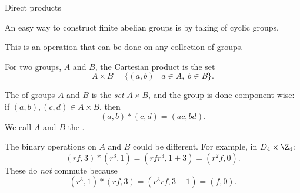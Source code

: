 \documentclass[8pt, handout]{beamer}
\newcommand{\Pause}{}
\begin{document}
\begin{frame}{Direct products}

  An easy way to construct finite abelian groups is by taking
   of cyclic groups. \medskip\Pause

  This is an operation that can be done on any collection
  of groups. \medskip\Pause
  
  For two groups, $A$ and $B$, the Cartesian product is the set
  \[
  A\times B=\big\{(a,b)\mid a\in A,\;b\in B\big\}.
  \]
  
  \vspace{-2mm}\Pause
  
  \begin{definition}
    The  of groups $A$ and $B$ is the
    \emph{set} $A\times B$, and the group  is
    done component-wise: \Pause if $(a,b),(c,d)\in A\times B$, then
    \[
    (a,b)*(c,d)=(ac,bd).
    \]
    \Pause We call $A$ and $B$ the .
  \end{definition}
  
  \smallskip\Pause
  
  The binary operations on $A$ and $B$ could be different. \Pause For
  example, in $D_4\times\Z_4$:
  \[
  (rf,3)*(r^3,1)=(rfr^3,1+3)\Pause=(r^2f,0). 
  \]
  \Pause These do \emph{not} commute because
  \[
  (r^3,1)*(rf,3)=(r^3rf,3+1)\Pause=(f,0).
  \]
  
\end{frame}

\end{document}
